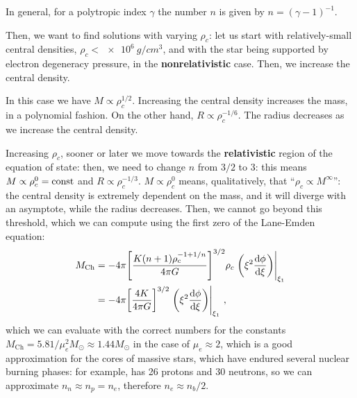 \documentclass[main.tex]{subfiles}
\begin{document}
In general, for a polytropic index \(\gamma \) the number \(n\) is given by \(n = (\gamma - 1)^{-1}\).

Then, we want to find solutions with varying \(\rho _c\): let us start with relatively-small central densities, \(\rho _c < \SI{e6}{g / cm^3}\), and with the star being supported by electron degeneracy pressure, in the \textbf{nonrelativistic} case.
Then, we increase the central density. 

In this case we have \(M \propto \rho _c^{1/2}\). Increasing the central density increases the mass, in a polynomial fashion. 
On the other hand, \(R \propto \rho _c^{- 1/6}\). The radius decreases as we increase the central density. 

Increasing \(\rho _c\), sooner or later we move towards the \textbf{relativistic} region of the equation of state: then, we need to change \(n\) from \(3/2\) to \(3\): this means \(M \propto \rho _c^{0} = \text{const}\) and \(R \propto \rho _c^{- 1/3}\). \(M \propto \rho _c^{0}\) means, qualitatively,  that ``\(\rho _c \propto M^{\infty }\)'': the central density is extremely dependent on the mass, and it will diverge with an asymptote, while the radius decreases. 
Then, we cannot go beyond this threshold, which we can compute using the first zero of the Lane-Emden equation: 
%
\begin{align}
M _{\text{Ch}} &= - 4 \pi \qty[\frac{K (n+1) \rho _c^{-1 + 1/n}}{4 \pi G}]^{3/2} \rho _c \eval{\qty(\xi^2 \dv{\phi }{\xi })}_{\xi_1 } \\
&= - 4 \pi \qty[\frac{4 K }{4 \pi G}]^{3/2} \eval{\qty(\xi^2 \dv{\phi }{\xi })}_{\xi_1 }
\,,
\end{align}
%
which we can evaluate with the correct numbers for the constants \(M _{\text{Ch}} = \num{5.81} / \mu _e^2 M_{\odot} \approx \num{1.44} M_{\odot}\) in the case of \(\mu _e \approx 2\), which is a good approximation for the cores of massive stars, which have endured several nuclear burning phases: for example,  has 26 protons and 30 neutrons, so we can approximate \(n_n \approx n_p = n_e\), therefore \(n_e \approx n_b /2\).

\end{document}
